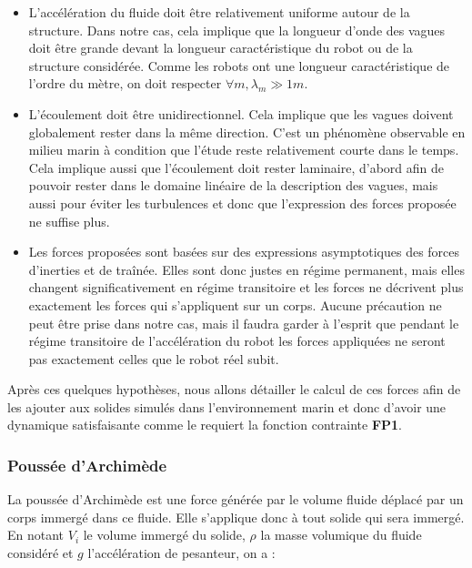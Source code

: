 				\begin{itemize}[noitemsep]
					\item[\textbullet] L'accélération du fluide doit être relativement uniforme autour de la structure. Dans notre cas, cela implique que la longueur d'onde des vagues doit être grande devant la longueur caractéristique du robot ou de la structure considérée. Comme les robots ont une longueur caractéristique de l'ordre du mètre, on doit respecter $\forall m, \lambda_m \gg 1 m$. \\
					\item[\textbullet] L'écoulement doit être unidirectionnel. Cela implique que les vagues doivent globalement rester dans la même direction. C'est un phénomène observable en milieu marin à condition que l'étude reste relativement courte dans le temps. Cela implique aussi que l'écoulement doit rester laminaire, d'abord afin de pouvoir rester dans le domaine linéaire de la description des vagues, mais aussi pour éviter les turbulences et donc que l'expression des forces proposée ne suffise plus. \\
					\item[\textbullet] Les forces proposées sont basées sur des expressions asymptotiques des forces d'inerties et de traînée. Elles sont donc justes en régime permanent, mais elles changent significativement en régime transitoire et les forces ne décrivent plus exactement les forces qui s'appliquent sur un corps. Aucune précaution ne peut être prise dans notre cas, mais il faudra garder à l'esprit que pendant le régime transitoire de l'accélération du robot les forces appliquées ne seront pas exactement celles que le robot réel subit.
				\end{itemize}

				Après ces quelques hypothèses, nous allons détailler le calcul de ces forces afin de les ajouter aux solides simulés dans l'environnement marin et donc d'avoir une dynamique satisfaisante comme le requiert la fonction contrainte \textbf{FP1}.

			\subsubsection{Poussée d'Archimède}

				La poussée d'Archimède est une force générée par le volume fluide déplacé par un corps immergé dans ce fluide. Elle s'applique donc à tout solide qui sera immergé. En notant $V_i$ le volume immergé du solide, $\rho$ la masse volumique du fluide considéré et $g$ l'accélération de pesanteur, on a :


